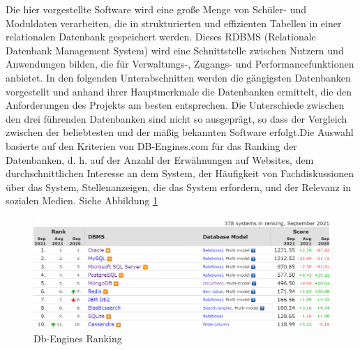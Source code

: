 Die hier vorgestellte Software wird eine große Menge von Schüler- und Moduldaten verarbeiten, die in strukturierten und effizienten Tabellen in einer relationalen
Datenbank gespeichert werden. Dieses RDBMS (Relationale Datenbank Management System) wird eine Schnittstelle zwischen Nutzern und Anwendungen bilden, die für Verwaltungs-,
Zugangs- und Performancefunktionen anbietet. In den folgenden Unterabschnitten werden die gängigsten Datenbanken vorgestellt und anhand ihrer Hauptmerkmale die Datenbanken ermittelt,
die den Anforderungen des Projekts am besten entsprechen. Die Unterschiede zwischen den drei führenden Datenbanken sind nicht so ausgeprägt, so dass der Vergleich zwischen
der beliebtesten und der mäßig bekannten Software erfolgt.Die Auswahl basierte auf den Kriterien von DB-Engines.com für das Ranking der Datenbanken,
d. h. auf der Anzahl der Erwähnungen auf Websites, dem durchschnittlichen Interesse an dem System, der Häufigkeit von Fachdiskussionen über das System, Stellenanzeigen,
die das System erfordern, und der Relevanz in sozialen Medien. Siehe Abbildung \ref{db_engines_ranking}
\begin{figure}[h]
    \begin{center}
        \includegraphics[scale=0.5]{./pics/db_engines_ranking.png}
        \caption{Db-Engines Ranking}
        \label{db_engines_ranking}
    \end{center}
\end{figure}
\newpage